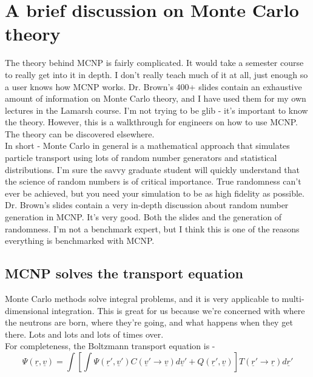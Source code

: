 \documentclass[11pt,a4paper]{article}
\begin{document}
\section{A brief discussion on Monte Carlo theory}
\noindent The theory behind MCNP is fairly complicated. It would take a semester course to really get into it in depth. I don't really teach much of it at all, just enough so a user knows how MCNP works. Dr. Brown's 400+ slides contain an exhaustive amount of information on Monte Carlo theory, and I have used them for my own lectures in the Lamarsh course. I'm not trying to be glib - it's important to know the theory. However, this is a walkthrough for engineers on how to use MCNP. The theory can be discovered elsewhere.\\

\noindent In short - Monte Carlo in general is a mathematical approach that simulates particle transport using lots of random number generators and statistical distributions. I'm sure the savvy graduate student will quickly understand that the science of random numbers is of critical importance. True randomness can't ever be achieved, but you need your simulation to be as high fidelity as possible. Dr. Brown's slides contain a very in-depth discussion about random number generation in
MCNP. It's very good. Both the slides and the generation of randomness. I'm not a benchmark expert, but I think this is one of the reasons everything is benchmarked with MCNP. 

\subsection{MCNP solves the transport equation}
\noindent Monte Carlo methods solve integral problems, and it is very applicable to multi-dimensional integration. This is great for us because we're concerned with where the neutrons are born, where they're going, and what happens when they get there. Lots and lots and lots of times over. \\

\noindent For completeness, the Boltzmann transport equation is - 
\begin{equation} \label{eq-transport}
    \Psi(\underline{r},\underline{v})=\int[\int\Psi(\underline{r}',\underline{v}')C(\underline{v}'\rightarrow\underline{v})d\underline{v}'+Q(\underline{r}',\underline{v})]T(\underline{r}'\rightarrow\underline{r})d\underline{r}'
\end{equation}
\end{document}
